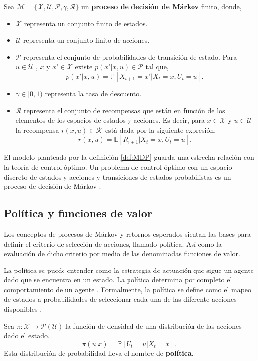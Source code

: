 \begin{definition}\label{def:MDP} Sea $\mathcal{M} =\{\mathcal{X}, \mathcal{U}, \mathcal{P}, \gamma, \mathcal{R}\}$  un \textbf{proceso de decisión de Márkov} finito, donde,
\begin{itemize}
    \item $\mathcal{X}$ representa un conjunto finito de estados.
    \item $\mathcal{U}$ representa un conjunto finito de acciones.
    \item $\mathcal{P}$ representa el conjunto de probabilidades de transición de estado. Para $u \in \mathcal{U}$ , $x$ y $x' \in \mathcal{X}$ existe 
    $p(x'|x, u) \in \mathcal{P}$ tal que,
    $$p(x'|x,u) = \mathbb{P}\left[X_{t+1}=x'|X_t=x, U_t =u\right].$$
    \item $\gamma \in [0,1)$ representa la tasa de descuento.
    \item $\mathcal{R}$ representa el conjunto de recompensas que están en función de los elementos de los espacios de estados y acciones. Es decir, para $x \in \mathcal{X}$ y $u\in \mathcal{U}$ la recompensa $r(x, u) \in \mathcal{R}$ está dada por la siguiente expresión,
    $$r(x, u)= \mathbb{E}[R_{t+1}|X_t=x, U_t=u].$$
\end{itemize}
\end{definition}

El modelo planteado por la definición \ref{def:MDP} guarda una estrecha relación con la teoría de control óptimo. Un problema de control óptimo con un espacio discreto de estados y acciones y transiciones de estados probabilistas es un proceso de decisión de Márkov \cite{Todorov2006}.

\subsection{Política y funciones de valor}
Los conceptos de procesos de Márkov y retornos esperados sientan las bases para definir el criterio de selección de acciones, llamado política. Así como 
la evaluación de dicho criterio por medio de las denominadas funciones de valor. 

La política se puede entender como la estrategia de actuación que sigue un agente dado que se encuentra en un estado. La política determina por completo el comportamiento de un agente \cite{silver2015}. Formalmente,
la política se define como el mapeo de estados a probabilidades de seleccionar cada una de las diferente acciones disponibles \cite{Sutton2018}. 
\begin{definition}
    Sea $\pi: \mathcal{X} \rightarrow \mathcal{P}(\mathcal{U})$ la función de densidad de una distribución de las acciones dado el estado. 
    $$\pi(u|x) = \mathbb{P}\left[U_t=u|X_t=x\right].$$
    Esta distribución de probabilidad lleva el nombre de \textbf{política}.
\end{definition}

